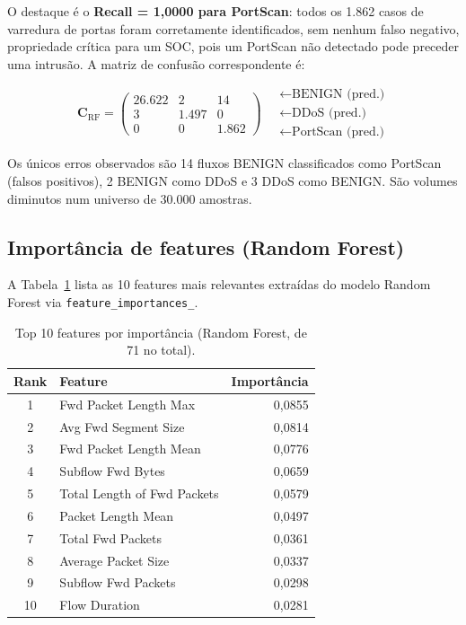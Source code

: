 \documentclass[12pt,a4paper]{article}
\begin{document}
O destaque é o \textbf{Recall = 1{,}0000 para PortScan}: todos os 1.862
casos de varredura de portas foram corretamente identificados, sem nenhum
falso negativo, propriedade crítica para um SOC, pois um PortScan não
detectado pode preceder uma intrusão. A matriz de confusão correspondente é:

\[
\mathbf{C}_{\text{RF}} =
\begin{pmatrix}
  26.622 & 2    & 14 \\
  3      & 1.497 & 0 \\
  0      & 0    & 1.862
\end{pmatrix}
\quad
\begin{array}{l}
  \leftarrow \text{BENIGN (pred.)} \\
  \leftarrow \text{DDoS (pred.)} \\
  \leftarrow \text{PortScan (pred.)}
\end{array}
\]

Os únicos erros observados são 14 fluxos BENIGN classificados como PortScan
(falsos positivos), 2 BENIGN como DDoS e 3 DDoS como BENIGN. São volumes
diminutos num universo de 30.000 amostras.

\subsection{Importância de features (Random Forest)}

A Tabela~\ref{tab:importance} lista as 10 features mais relevantes extraídas
do modelo Random Forest via \texttt{feature\_importances\_}.

\begin{table}[ht]
  \centering
  \caption{Top 10 features por importância (Random Forest, de 71 no total).}
  \label{tab:importance}
  \begin{tabular}{@{}clr@{}}
    \toprule
    \textbf{Rank} & \textbf{Feature} & \textbf{Importância} \\
    \midrule
    1  & Fwd Packet Length Max         & 0{,}0855 \\
    2  & Avg Fwd Segment Size          & 0{,}0814 \\
    3  & Fwd Packet Length Mean        & 0{,}0776 \\
    4  & Subflow Fwd Bytes             & 0{,}0659 \\
    5  & Total Length of Fwd Packets   & 0{,}0579 \\
    6  & Packet Length Mean            & 0{,}0497 \\
    7  & Total Fwd Packets             & 0{,}0361 \\
    8  & Average Packet Size           & 0{,}0337 \\
    9  & Subflow Fwd Packets           & 0{,}0298 \\
    10 & Flow Duration                 & 0{,}0281 \\
    \bottomrule
  \end{tabular}
\end{table}
\end{document}
